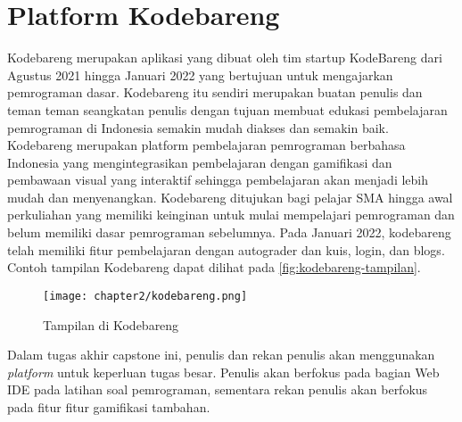 \section{Platform Kodebareng}

Kodebareng merupakan aplikasi yang dibuat oleh tim startup KodeBareng dari Agustus 2021 hingga Januari 2022 yang bertujuan untuk mengajarkan pemrograman dasar. Kodebareng itu sendiri merupakan buatan penulis dan teman teman seangkatan penulis dengan tujuan membuat edukasi pembelajaran pemrograman di Indonesia semakin mudah diakses dan semakin baik. Kodebareng merupakan platform pembelajaran pemrograman berbahasa Indonesia yang mengintegrasikan pembelajaran dengan gamifikasi dan pembawaan visual yang interaktif sehingga pembelajaran akan menjadi lebih mudah dan menyenangkan. Kodebareng ditujukan bagi pelajar SMA hingga awal perkuliahan yang memiliki keinginan untuk mulai mempelajari pemrograman dan belum memiliki dasar pemrograman sebelumnya. Pada Januari 2022, kodebareng telah memiliki fitur pembelajaran dengan autograder dan kuis, login, dan blogs. Contoh tampilan Kodebareng dapat dilihat pada \autoref{fig:kodebareng-tampilan}.

\begin{figure}[h]
  \centering
  \texttt{[image: chapter2/kodebareng.png]}
  \caption{Tampilan di Kodebareng}\label{fig:kodebareng-tampilan}
\end{figure}

Dalam tugas akhir capstone ini, penulis dan rekan penulis akan menggunakan \textit{platform} untuk keperluan tugas besar. Penulis akan berfokus pada bagian Web IDE pada latihan soal pemrograman, sementara rekan penulis akan berfokus pada fitur fitur gamifikasi tambahan.